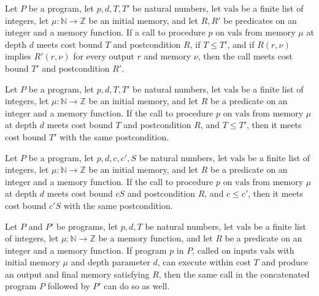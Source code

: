 \begin{theorem}
\label{Light.Meets.mono}
\leanok
{}
Let $P$ be a program, let $p,d,T,T'$ be natural numbers, let $\mathrm{vals}$ be a finite
list of integers, let $\mu : \mathbb{N}\to\mathbb{Z}$ be an initial memory, and let
$R,R'$ be predicates on an integer and a memory function. If a call to procedure $p$ on
$\mathrm{vals}$ from memory $\mu$ at depth $d$ meets cost bound $T$ and postcondition
$R$, if $T\le T'$, and if $R(r,\nu)$ implies $R'(r,\nu)$ for every output $r$ and memory
$\nu$, then the call meets cost bound $T'$ and postcondition $R'$.
\end{theorem}

\begin{theorem}
\label{Light.Meets.mono_time}
\leanok
{}
Let $P$ be a program, let $p,d,T,T'$ be natural numbers, let $\mathrm{vals}$ be a finite
list of integers, let $\mu : \mathbb{N}\to\mathbb{Z}$ be an initial memory, and let $R$
be a predicate on an integer and a memory function. If the call to procedure $p$ on
$\mathrm{vals}$ from memory $\mu$ at depth $d$ meets cost bound $T$ and postcondition
$R$, and $T\le T'$, then it meets cost bound $T'$ with the same postcondition.
\end{theorem}

\begin{theorem}
\label{Light.Meets.mono_const}
\leanok
{}
Let $P$ be a program, let $p,d,c,c',S$ be natural numbers, let $\mathrm{vals}$ be a
finite list of integers, let $\mu : \mathbb{N}\to\mathbb{Z}$ be an initial memory, and
let $R$ be a predicate on an integer and a memory function. If the call to procedure $p$
on $\mathrm{vals}$ from memory $\mu$ at depth $d$ meets cost bound $cS$ and
postcondition $R$, and $c\le c'$, then it meets cost bound $c'S$ with the same
postcondition.
\end{theorem}

\begin{theorem}
\label{Light.Meets.append}
\leanok
{}
Let $P$ and $P'$ be programs, let $p,d,T$ be natural numbers, let $\mathrm{vals}$ be a
finite list of integers, let $\mu : \mathbb{N}\to\mathbb{Z}$ be a memory function, and
let $R$ be a predicate on an integer and a memory function. If program $p$ in $P$,
called on inputs $\mathrm{vals}$ with initial memory $\mu$ and depth parameter $d$, can
execute within cost $T$ and produce an output and final memory satisfying $R$, then the
same call in the concatenated program $P$ followed by $P'$ can do so as well.
\end{theorem}

